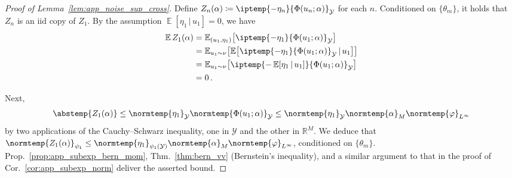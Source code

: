 \documentclass{article}
\theoremstyle{plain}
\theoremstyle{my_def}
\theoremstyle{my_rem}
\numberwithin{equation}{section}
\numberwithin{theorem}{section}%
\newcommand{\R}{\mathbb{R}}
\newcommand{\E}{\mathbb{E}}
\newcommand{\cY}{\mathcal{Y}}
\let\originalleft\left %
\let\originalright\right
\renewcommand{\left}{\mathopen{}\mathclose\bgroup\originalleft}
\renewcommand{\right}{\aftergroup\egroup\originalright}
\newcommand{\ip}{\iptemp}
\newcommand{\norm}{\normtemp}
\newcommand{\abs}{\abstemp}
\newcommand{\defeq}{\coloneqq} %
\newcommand{\condbar}{\, \vert \,}
\renewcommand{\E}{\operatorname{\mathbb{E}}} %
\newcommand{\al}{\alpha}
\newcommand{\Th}{{\{\theta_m\}}}
\renewcommand{\phi}{\varphi}
\begin{document}
\begin{proof}[Proof of Lemma~\ref{lem:app_noise_sup_cross}]
    Define $Z_n(\al)\defeq \ip{-\eta_n}{\Phi(u_n;\alpha)}_\cY$ for each $n$. Conditioned on $\Th$, it holds that $Z_n$ is an iid copy of $Z_1$. By the assumption $\E[\eta_1 \condbar u_1] = 0$, we have
    \begin{align}
    \begin{aligned}
    \label{eq:Z1eq}
    \E Z_1(\alpha) 
    &= \E_{(u_1,\eta_1)}\left[\ip{-\eta_1}{\Phi(u_1;\alpha)}_\cY\right]
        \\
    &=\E_{u_1\sim \nu}\left[\E\left[\ip{-\eta_1}{\Phi(u_1;\alpha)}_\cY\condbar u_1\right]\right]
    \\
    &=\E_{u_1\sim \nu}\left[\ip{-\E[\eta_1\condbar u_1]}{\Phi(u_1;\alpha)}_\cY\right]
    \\
    &=0\,.
    \end{aligned}
    \end{align}
    
    Next,
    \begin{equation*}
        \abs{Z_1(\al)}\leq \norm{\eta_1}_{\cY}\norm{\Phi(u_1;\al)}_\cY\leq \norm{\eta_1}_{\cY}\norm{\al}_M\norm{\phi}_{L^\infty}
    \end{equation*}
    by two applications of the Cauchy--Schwarz inequality, one in $\cY$ and the other in $\R^M$. We deduce that $\norm{Z_1(\al)}_{\psi_1}\leq \norm{\eta_1}_{\psi_1(\cY)}\norm{\al}_M\norm{\phi}_{L^\infty}$, conditioned on $\Th$. Prop.~\ref{prop:app_subexp_bern_mom}, Thm.~\ref{thm:bern_vv} (Bernstein's inequality), and a similar argument to that in the proof of Cor.~\ref{cor:app_subexp_norm} deliver the asserted bound.
\end{proof}
\end{document}

